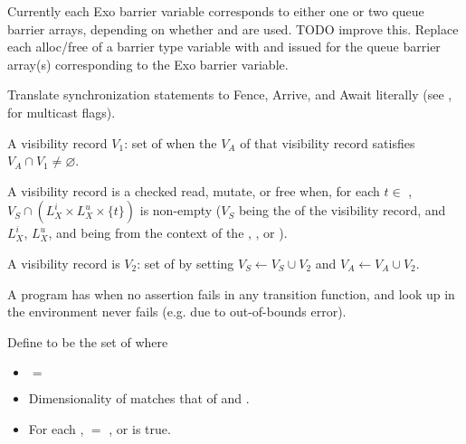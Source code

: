 \filbreak
{} Currently each Exo barrier variable corresponds to either one or two queue barrier arrays, depending on whether  and  are used.
TODO improve this.
Replace each alloc/free of a barrier type variable with  and  issued for the queue barrier array(s) corresponding to the Exo barrier variable.

\filbreak
Translate synchronization statements to Fence, Arrive, and Await literally (see , for multicast flags).

\filbreak
{}

A visibility record  $V_1$: set of  when the $V_A$ of that visibility record satisfies $V_A \cap V_1 \ne \varnothing$.

\filbreak
A visibility record is  a checked read, mutate, or free when, for each $t \in$ , $V_S \cap (L_X^i \times L_X^u \times \{ t \})$ is non-empty ($V_S$ being the  of the visibility record, and $L_X^i$, $L_X^u$, and  being from the context of the , , or ).

\filbreak
A visibility record is  $V_2$: set of  by setting $V_S \leftarrow V_S \cup V_2$ and $V_A \leftarrow V_A \cup V_2$.

\filbreak
A program has  when no assertion fails in any transition function, and look up in the environment never fails (e.g. due to out-of-bounds error).

\filbreak
Define  to be the set of  where
\begin{itemize}
  \item {} $=$ 
  \filbreak
  \item Dimensionality of  matches that of  and .
  \filbreak
  \item For each ,  $=$ , or  is true.
\end{itemize}

\filbreak
{}

